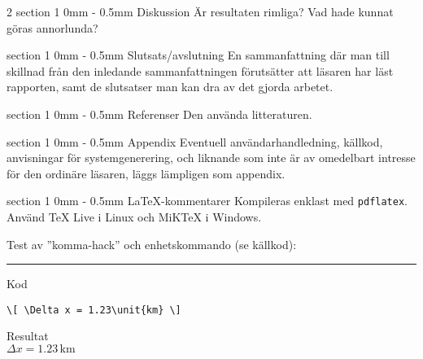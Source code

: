 \documentclass[a4paper]{article}
\makeatletter
\newcommand{\unit}[1]{\ensuremath{\,\mathrm{#1}}}
\renewcommand{\section}{\@startsection
{section}%
{1}%
{0mm}%
{-\baselineskip}%
{0.5mm}%
{\normalfont\bfseries}} %
\makeatother
\begin{document}
\begin{multicols}{2}
  \section{Diskussion}
  Är resultaten rimliga? Vad hade kunnat göras annorlunda?

  \section{Slutsats/avslutning}
  En   sammanfattning  där   man  till   skillnad  från   den  inledande
  sammanfattningen förutsätter  att läsaren har läst  rapporten, samt de
  slutsatser man kan dra av det gjorda arbetet.

  \section{Referenser}
  Den använda litteraturen.

  \section{Appendix}
  Eventuell     användarhandledning,     källkod,    anvisningar     för
  systemgenerering, och liknande som inte  är av omedelbart intresse för
  den ordinäre läsaren, läggs lämpligen som appendix.

\end{multicols}

\section{\LaTeX-kommentarer}
Kompileras enklast med \texttt{pdflatex}. Använd TeX Live i Linux och
MiKTeX i Windows.

Test av ”komma-hack” och enhetskommando (se källkod):
\hrule
\begin{minipage}{0.5\linewidth}
  Kod
\begin{verbatim}
\[ \Delta x = 1.23\unit{km} \]
\end{verbatim}
\end{minipage}
\begin{minipage}{0.5\linewidth}
  Resultat\\
  $ \Delta x = 1.23\unit{km} $
\end{minipage}
\end{document}
